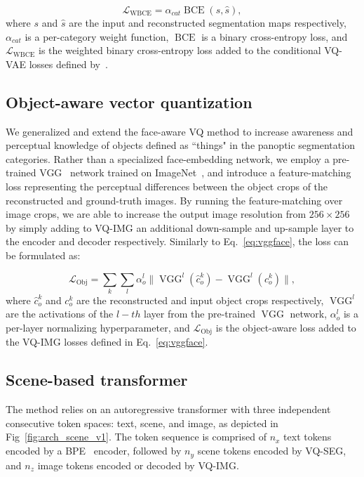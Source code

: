 \documentclass[final]{cvpr}
\begin{document}
\begin{equation}
    \mathcal{L}_\text{WBCE} = \alpha_{cat}\operatorname{BCE}(s,\hat{s}),
    \label{eq:wbce}
\end{equation}
where $s$ and $\hat{s}$ are the input and reconstructed segmentation maps respectively, $\alpha_{cat}$ is a per-category weight function, $\operatorname{BCE}$ is a binary cross-entropy loss, and $\mathcal{L}_\text{WBCE}$ is the weighted binary cross-entropy loss added to the conditional VQ-VAE losses defined by~\cite{esser2021taming}.

\subsection{Object-aware vector quantization}
We generalized and extend the face-aware VQ method to increase awareness and perceptual knowledge of objects defined as ``things" in the panoptic segmentation categories. Rather than a specialized face-embedding network, we employ a pre-trained VGG~\cite{simonyan2014very} network trained on ImageNet~\cite{krizhevsky2012imagenet}, and introduce a feature-matching loss representing the perceptual differences between the object crops of the reconstructed and ground-truth images. By running the feature-matching over image crops, we are able to increase the output image resolution from $256\times256$ by simply adding to VQ-IMG an additional down-sample and up-sample layer to the encoder and decoder respectively. Similarly to Eq.~\ref{eq:vggface}, the loss can be formulated as:

\begin{equation}
    \mathcal{L}_\text{Obj} = \sum_k\sum_l\alpha_o^l
    \|\operatorname{VGG}^l(\hat{c}_{o}^{k})-\operatorname{VGG}^{l}(c_{o}^{k})\|,
    \label{eq:vgg_obj}
\end{equation}
where $\hat{c}_{o}^{k}$ and $c_{o}^{k}$ are the reconstructed and input object crops respectively, $\operatorname{VGG}^l$ are the activations of the $l-th$ layer from the pre-trained $\operatorname{VGG}$ network, $\alpha_o^l$ is a per-layer normalizing hyperparameter, and $\mathcal{L}_\text{Obj}$ is the object-aware loss added to the VQ-IMG losses defined in Eq.~\ref{eq:vggface}.

\subsection{Scene-based transformer}
The method relies on an autoregressive transformer with three independent consecutive token spaces: text, scene, and image, as depicted in Fig~\ref{fig:arch_scene_v1}. The token sequence is comprised of $n_{x}$ text tokens encoded by a BPE~\cite{sennrich2015neural} encoder, followed by $n_{y}$ scene tokens encoded by VQ-SEG, and $n_{z}$ image tokens encoded or decoded by VQ-IMG. 
\end{document}
